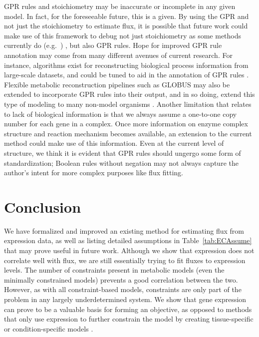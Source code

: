 GPR rules and stoichiometry may be inaccurate or
incomplete in any given model. In fact, for the foreseeable future,
this is a given. By using the GPR and not just the stoichiometry to
estimate flux, it is possible that future work could make use of this
framework to debug not just stoichiometry as some methods currently do
(e.g.\ \citealt{Reed14112006}) , but also GPR rules.  Hope for
improved GPR rule annotation may come from many different avenues of
current research. For instance, algorithms exist for reconstructing
biological process information from large-scale datasets, and could be
tuned to aid in the annotation of GPR rules \citep{Mitra2013}. 
Flexible metabolic reconstruction pipelines such as
GLOBUS may also be extended to incorporate GPR rules into their output, and
in so doing, extend this type of modeling to many non-model organisms
\citep{Plata2012}. Another limitation that relates to lack of
biological information is that we always assume a one-to-one copy
number for each gene in a complex. Once more information on enzyme
complex structure and reaction mechanism becomes available, an
extension to the current method could make use of this information.
Even at the current level of structure, we think it is evident
that GPR rules should ungergo some form of standardization;
Boolean rules without negation may not always capture the author's
intent for more complex purposes like flux fitting.



%
%


\section{Conclusion}

We have formalized and improved an existing method for estimating flux
from expression data, as well as listing detailed assumptions in
\suppOrApp Table~\ref{tab:ECAssume} that may prove useful in future
work. Although we show that expression does not correlate well with
flux, we are still essentially trying to fit fluxes to expression
levels.  The number of constraints present in metabolic models (even
the minimally constrained models) prevents a good correlation between
the two. However, as with all constraint-based models, constraints are
only part of the problem in any largely underdetermined system. We
show that gene expression can prove to be a valuable basis for forming
an objective, as opposed to methods that only use expression to
further constrain the model by creating tissue-specific or
condition-specific models \citep{Shlomi2008,Becker2008}.

